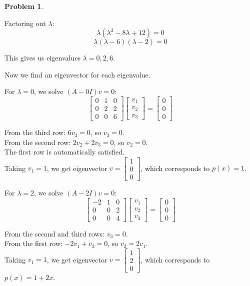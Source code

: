 \documentclass[12pt, oneside]{amsart}
\theoremstyle{definition}
\newtheorem{prob}{Problem}
\begin{document}
\begin{prob}
\begin{solution}
Factoring out $\lambda$:
\[
\lambda(\lambda^2 - 8\lambda + 12) = 0
\]
\[
\lambda(\lambda - 6)(\lambda - 2) = 0
\]

This gives us eigenvalues $\lambda = 0, 2, 6$.

Now we find an eigenvector for each eigenvalue.

For $\lambda = 0$, we solve $(A - 0I)v = 0$:
\[
\begin{bmatrix} 0 & 1 & 0 \\ 0 & 2 & 2 \\ 0 & 0 & 6 \end{bmatrix} \begin{bmatrix} v_1 \\ v_2 \\ v_3 \end{bmatrix} = \begin{bmatrix} 0 \\ 0 \\ 0 \end{bmatrix}
\]

From the third row: $6v_3 = 0$, so $v_3 = 0$.\\
From the second row: $2v_2 + 2v_3 = 0$, so $v_2 = 0$.\\
The first row is automatically satisfied.\\
Taking $v_1 = 1$, we get eigenvector $v = \begin{bmatrix} 1 \\ 0 \\ 0 \end{bmatrix}$, which corresponds to $p(x) = 1$.

For $\lambda = 2$, we solve $(A - 2I)v = 0$:
\[
\begin{bmatrix} -2 & 1 & 0 \\ 0 & 0 & 2 \\ 0 & 0 & 4 \end{bmatrix} \begin{bmatrix} v_1 \\ v_2 \\ v_3 \end{bmatrix} = \begin{bmatrix} 0 \\ 0 \\ 0 \end{bmatrix}
\]

From the second and third rows: $v_3 = 0$.\\
From the first row: $-2v_1 + v_2 = 0$, so $v_2 = 2v_1$.\\
Taking $v_1 = 1$, we get eigenvector $v = \begin{bmatrix} 1 \\ 2 \\ 0 \end{bmatrix}$, which corresponds to $p(x) = 1 + 2x$.


\end{solution}
\end{prob}
\end{document}
